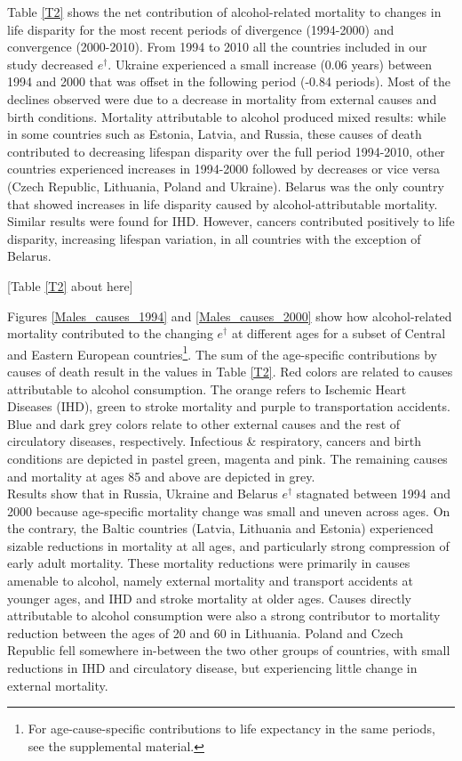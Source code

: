 \documentclass{article}
\begin{document}
\begin{spacing}{1.5}
Table \ref{T2} shows the net contribution of alcohol-related mortality to changes in life disparity for the most recent periods of divergence (1994-2000) and convergence (2000-2010). From 1994 to 2010 all the countries included in our study decreased $e^\dagger$. Ukraine experienced a small increase (0.06 years) between 1994 and 2000 that was offset in the following period (-0.84 periods). Most of the declines observed were due to a decrease in mortality from external causes and birth conditions. Mortality attributable to alcohol produced mixed results: while in some countries such as Estonia, Latvia, and Russia, these causes of death contributed to decreasing lifespan disparity over the full period 1994-2010, other countries experienced increases in 1994-2000 followed by decreases or vice versa (Czech Republic, Lithuania, Poland and Ukraine). Belarus was the only country that showed increases in life disparity caused by alcohol-attributable mortality. Similar results were found for IHD. However, cancers contributed positively to life disparity, increasing lifespan variation, in all countries with the exception of Belarus. 

\begin{center}
[Table  \ref{T2} about here]\\
\end{center}


Figures \ref{Males_causes_1994} and \ref{Males_causes_2000} show how alcohol-related mortality contributed to the changing $e^\dagger$ at different ages for a subset of Central and Eastern European countries\footnote{For age-cause-specific contributions to life expectancy in the same periods, see the supplemental material.}. The sum of the age-specific contributions by causes of death result in the values in Table \ref{T2}. Red colors are related to causes attributable to alcohol consumption. The orange refers to Ischemic Heart Diseases (IHD), green to stroke mortality and purple to transportation accidents. Blue and dark grey colors relate to other external causes and the rest of circulatory diseases, respectively. Infectious \& respiratory, cancers and birth conditions are depicted in pastel green, magenta and pink. The remaining causes and mortality at ages 85 and above are depicted in grey.\\

Results show that in Russia, Ukraine and Belarus $e^\dagger$ stagnated between 1994 and 2000 because age-specific mortality change was small and uneven across ages. On the contrary, the Baltic countries (Latvia, Lithuania and Estonia) experienced sizable reductions in mortality at all ages, and particularly strong compression of early adult mortality. These mortality reductions were primarily in causes amenable to alcohol, namely external mortality and transport accidents at younger ages, and IHD and stroke mortality at older ages. Causes directly attributable to alcohol consumption were also a strong contributor to mortality reduction between the ages of 20 and 60 in Lithuania. Poland and Czech Republic fell somewhere in-between the two other groups of countries, with small reductions in IHD and circulatory disease, but experiencing little change in external mortality.\\


\end{spacing}
\end{document}
